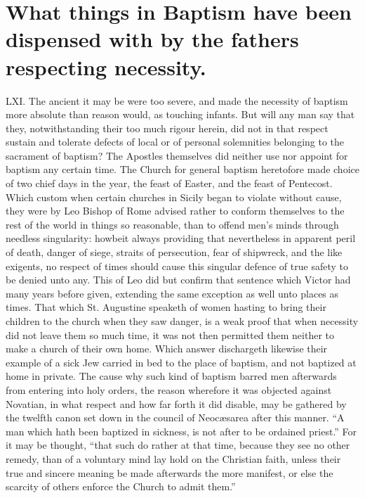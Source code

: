 \section*{What things in Baptism have been dispensed with by the fathers respecting necessity.}
LXI. The ancient it may be were too severe, and made the necessity of baptism more absolute than reason would, as touching  infants. But will any man say that they, notwithstanding their too much rigour herein, did not in that respect sustain and tolerate defects of local or of personal solemnities belonging to the sacrament of baptism? The Apostles themselves did neither use nor appoint for baptism any certain time. The Church for general baptism heretofore made choice of two chief days in the year, the feast of Easter, and the feast of Pentecost. Which custom when certain churches in Sicily began to violate without cause, they were by Leo Bishop of Rome advised rather to conform themselves to the rest of the world in things so reasonable, than to offend men’s minds through needless singularity: howbeit always providing that  nevertheless in apparent peril of death, danger of siege, straits of persecution, fear of shipwreck, and the like exigents, no respect of times should cause this singular defence of true safety to be denied unto any. This of Leo did but confirm that sentence which Victor had many years before given, extending the same exception as well unto places as times.
That which St. Augustine speaketh of women hasting to bring their children to the church when they saw danger, is a weak proof that when necessity did not leave them so much time, it was not then permitted them neither to make a church of their own home.
Which answer dischargeth likewise their example of a sick Jew carried in bed to the place of baptism, and not baptized at home in private.
The cause why such kind of baptism barred men afterwards from entering into holy orders, the reason wherefore it was objected against Novatian, in what respect and how far forth it did disable, may be gathered by the twelfth canon set down in the council of Neocæsarea after this manner. “A man which hath been baptized in sickness, is not after to be ordained priest.” For it may be thought, “that such do rather at that time, because they see no other remedy, than of a voluntary mind lay hold on the Christian faith, unless their true and sincere meaning be made afterwards the more manifest, or else the scarcity of others enforce the Church to admit them.”
